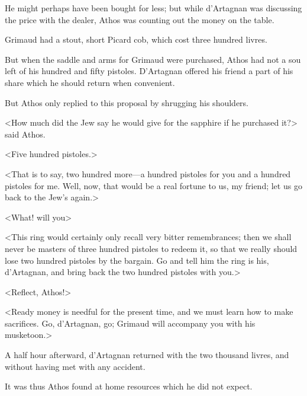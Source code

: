He might perhaps have been bought for less; but while d'Artagnan was discussing the price with the dealer, Athos was counting out the money on the table. 

Grimaud had a stout, short Picard cob, which cost three hundred livres. 

But when the saddle and arms for Grimaud were purchased, Athos had not a sou left of his hundred and fifty pistoles. D'Artagnan offered his friend a part of his share which he should return when convenient. 

But Athos only replied to this proposal by shrugging his shoulders. 

<How much did the Jew say he would give for the sapphire if he purchased it?> said Athos. 

<Five hundred pistoles.> 

<That is to say, two hundred more---a hundred pistoles for you and a hundred pistoles for me. Well, now, that would be a real fortune to us, my friend; let us go back to the Jew's again.> 

<What! will you\longdash> 

<This ring would certainly only recall very bitter remembrances; then we shall never be masters of three hundred pistoles to redeem it, so that we really should lose two hundred pistoles by the bargain. Go and tell him the ring is his, d'Artagnan, and bring back the two hundred pistoles with you.> 

<Reflect, Athos!> 

<Ready money is needful for the present time, and we must learn how to make sacrifices. Go, d'Artagnan, go; Grimaud will accompany you with his musketoon.> 

A half hour afterward, d'Artagnan returned with the two thousand livres, and without having met with any accident. 

It was thus Athos found at home resources which he did not expect.